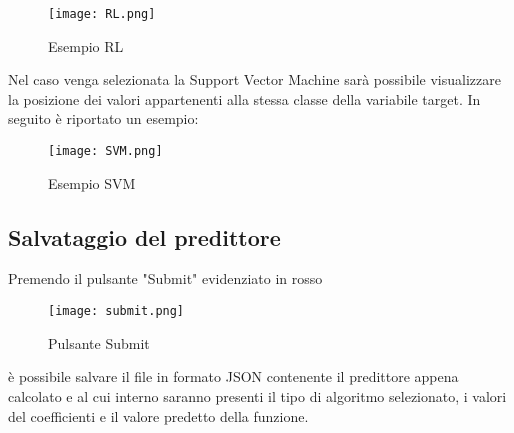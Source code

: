 \documentclass[../manuale-utente.tex]{subfiles}
\begin{document}
\begin{figure}[h!]
  \begin{center}
    \texttt{[image: RL.png]}\\
    \caption{Esempio RL}%
    \label{fig:RL}
  \end{center}
  \end{figure}


\newpage
Nel caso venga selezionata la Support Vector Machine sarà possibile visualizzare la posizione dei valori appartenenti alla stessa classe della variabile target. In seguito è riportato un esempio:

  \begin{figure}[h!]
    \begin{center}
      \texttt{[image: SVM.png]}\\
      \caption{Esempio SVM}%
      \label{fig:SVM}
    \end{center}
    \end{figure}

\newpage
\subsection{Salvataggio del predittore}
\label{subs:salvataggio-del-predittore}
Premendo il pulsante "Submit" evidenziato in rosso

\begin{figure}[h!]
  \begin{center}
    \texttt{[image: submit.png]}\\
    \caption{Pulsante Submit}%
    \label{fig:pulsante-submit}
  \end{center}
\end{figure}

è possibile salvare il file in formato JSON contenente il predittore appena calcolato e al cui interno saranno presenti il tipo di algoritmo selezionato, i valori del coefficienti e il valore predetto della funzione.
\end{document}
